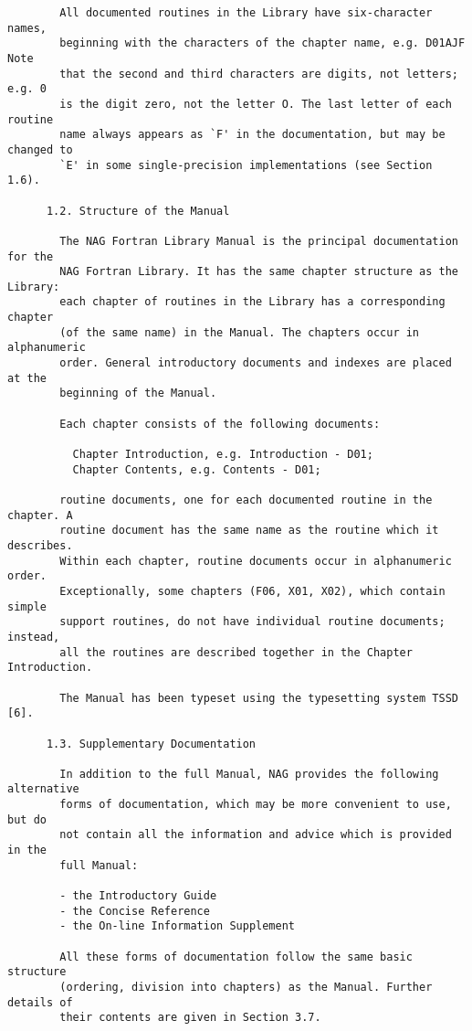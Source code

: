 \begin{small}
\begin{verbatim}
        All documented routines in the Library have six-character names,
        beginning with the characters of the chapter name, e.g. D01AJF Note
        that the second and third characters are digits, not letters; e.g. 0
        is the digit zero, not the letter O. The last letter of each routine
        name always appears as `F' in the documentation, but may be changed to
        `E' in some single-precision implementations (see Section 1.6).

      1.2. Structure of the Manual

        The NAG Fortran Library Manual is the principal documentation for the
        NAG Fortran Library. It has the same chapter structure as the Library:
        each chapter of routines in the Library has a corresponding chapter
        (of the same name) in the Manual. The chapters occur in alphanumeric
        order. General introductory documents and indexes are placed at the
        beginning of the Manual.

        Each chapter consists of the following documents:

          Chapter Introduction, e.g. Introduction - D01;
          Chapter Contents, e.g. Contents - D01;

        routine documents, one for each documented routine in the chapter. A
        routine document has the same name as the routine which it describes.
        Within each chapter, routine documents occur in alphanumeric order.
        Exceptionally, some chapters (F06, X01, X02), which contain simple
        support routines, do not have individual routine documents; instead,
        all the routines are described together in the Chapter Introduction.

        The Manual has been typeset using the typesetting system TSSD [6].

      1.3. Supplementary Documentation

        In addition to the full Manual, NAG provides the following alternative
        forms of documentation, which may be more convenient to use, but do
        not contain all the information and advice which is provided in the
        full Manual:

        - the Introductory Guide
        - the Concise Reference
        - the On-line Information Supplement

        All these forms of documentation follow the same basic structure
        (ordering, division into chapters) as the Manual. Further details of
        their contents are given in Section 3.7.


\end{verbatim}
\end{small}
